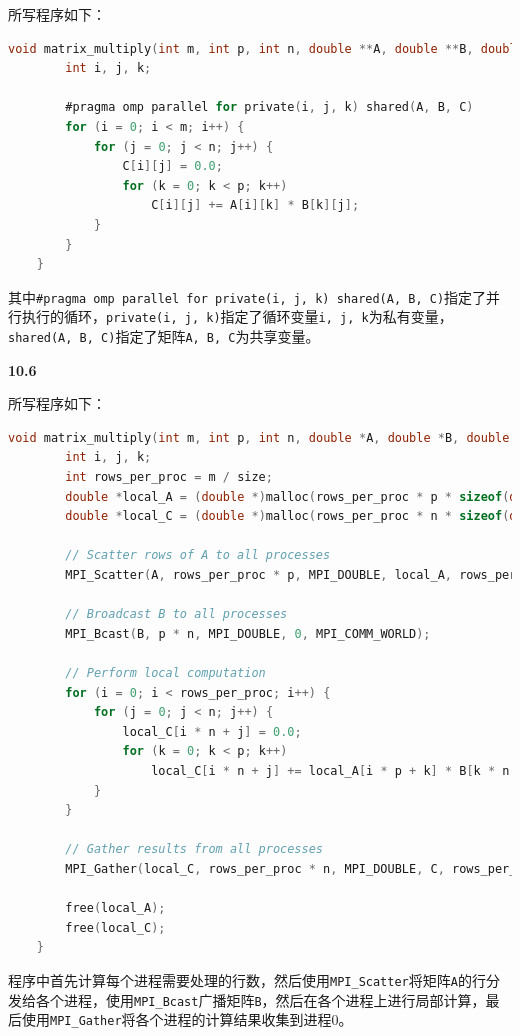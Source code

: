 \documentclass[UTF8]{report}
\begin{document}
所写程序如下：

\begin{lstlisting}[language=C]
    void matrix_multiply(int m, int p, int n, double **A, double **B, double **C) {
        int i, j, k;
    
        #pragma omp parallel for private(i, j, k) shared(A, B, C)
        for (i = 0; i < m; i++) {
            for (j = 0; j < n; j++) {
                C[i][j] = 0.0;
                for (k = 0; k < p; k++) 
                    C[i][j] += A[i][k] * B[k][j];
            }
        }
    }
\end{lstlisting}

其中\texttt{\#pragma omp parallel for private(i, j, k) shared(A, B, C)}指定了并行执行的循环，\texttt{private(i, j, k)}指定了循环变量\texttt{i, j, k}为私有变量，\texttt{shared(A, B, C)}指定了矩阵\texttt{A, B, C}为共享变量。

\noindent
\textbf{10.6}

所写程序如下：

\begin{lstlisting}[language=C]
    void matrix_multiply(int m, int p, int n, double *A, double *B, double *C, int size) {
        int i, j, k;
        int rows_per_proc = m / size;
        double *local_A = (double *)malloc(rows_per_proc * p * sizeof(double));
        double *local_C = (double *)malloc(rows_per_proc * n * sizeof(double));
    
        // Scatter rows of A to all processes
        MPI_Scatter(A, rows_per_proc * p, MPI_DOUBLE, local_A, rows_per_proc * p, MPI_DOUBLE, 0, MPI_COMM_WORLD);
    
        // Broadcast B to all processes
        MPI_Bcast(B, p * n, MPI_DOUBLE, 0, MPI_COMM_WORLD);
    
        // Perform local computation
        for (i = 0; i < rows_per_proc; i++) {
            for (j = 0; j < n; j++) {
                local_C[i * n + j] = 0.0;
                for (k = 0; k < p; k++) 
                    local_C[i * n + j] += local_A[i * p + k] * B[k * n + j];
            }
        }
    
        // Gather results from all processes
        MPI_Gather(local_C, rows_per_proc * n, MPI_DOUBLE, C, rows_per_proc * n, MPI_DOUBLE, 0, MPI_COMM_WORLD);
    
        free(local_A);
        free(local_C);
    }
\end{lstlisting}

程序中首先计算每个进程需要处理的行数，然后使用\texttt{MPI\_Scatter}将矩阵\texttt{A}的行分发给各个进程，使用\texttt{MPI\_Bcast}广播矩阵\texttt{B}，然后在各个进程上进行局部计算，最后使用\texttt{MPI\_Gather}将各个进程的计算结果收集到进程0。
\end{document}
